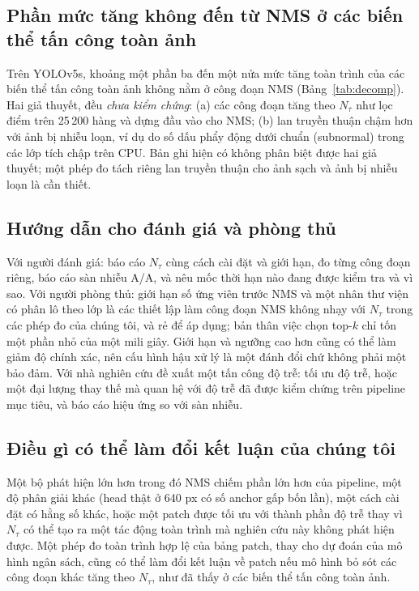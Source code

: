 \documentclass[12pt,a4paper]{article}
\newcommand{\Ntau}{N_{\tau}}
\begin{document}
\subsection{Phần mức tăng không đến từ NMS ở các biến thể tấn công toàn ảnh}
Trên YOLOv5s, khoảng một phần ba đến một nửa mức tăng toàn trình của các biến thể tấn công toàn ảnh không nằm ở công đoạn NMS (Bảng~\ref{tab:decomp}). Hai giả thuyết, đều \emph{chưa kiểm chứng}: (a) các công đoạn tăng theo $\Ntau$ như lọc điểm trên 25\,200 hàng và dựng đầu vào cho NMS; (b) lan truyền thuận chậm hơn với ảnh bị nhiễu loạn, ví dụ do số dấu phẩy động dưới chuẩn (subnormal) trong các lớp tích chập trên CPU. Bản ghi hiện có không phân biệt được hai giả thuyết; một phép đo tách riêng lan truyền thuận cho ảnh sạch và ảnh bị nhiễu loạn là cần thiết.

\subsection{Hướng dẫn cho đánh giá và phòng thủ}
Với người đánh giá: báo cáo $\Ntau$ cùng cách cài đặt và giới hạn, đo từng công đoạn riêng, báo cáo sàn nhiễu A/A, và nêu mốc thời hạn nào đang được kiểm tra và vì sao. Với người phòng thủ: giới hạn số ứng viên trước NMS và một nhân thư viện có phân lô theo lớp là các thiết lập làm công đoạn NMS không nhạy với $\Ntau$ trong các phép đo của chúng tôi, và rẻ để áp dụng; bản thân việc chọn top-$k$ chỉ tốn một phần nhỏ của một mili giây. Giới hạn và ngưỡng cao hơn cũng có thể làm giảm độ chính xác, nên cấu hình hậu xử lý là một đánh đổi chứ không phải một bảo đảm. Với nhà nghiên cứu đề xuất một tấn công độ trễ: tối ưu độ trễ, hoặc một đại lượng thay thế mà quan hệ với độ trễ đã được kiểm chứng trên pipeline mục tiêu, và báo cáo hiệu ứng so với sàn nhiễu.

\subsection{Điều gì có thể làm đổi kết luận của chúng tôi}
Một bộ phát hiện lớn hơn trong đó NMS chiếm phần lớn hơn của pipeline, một độ phân giải khác (head thật ở 640 px có số anchor gấp bốn lần), một cách cài đặt có hằng số khác, hoặc một patch được tối ưu với thành phần độ trễ thay vì $\Ntau$ có thể tạo ra một tác động toàn trình mà nghiên cứu này không phát hiện được. Một phép đo toàn trình hợp lệ của bảng patch, thay cho dự đoán của mô hình ngân sách, cũng có thể làm đổi kết luận về patch nếu mô hình bỏ sót các công đoạn khác tăng theo $\Ntau$, như đã thấy ở các biến thể tấn công toàn ảnh.
\end{document}
